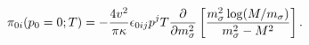 \begin{equation}\label{planarT}
{\cal{\pi}}_{0i} (p_0=0;T)=-\frac{4 v^2}{\pi \kappa} \epsilon_{0ij}p^j
T \frac{\partial}{\partial m_{\sigma}^2} \left[\frac{m_{\sigma}^2 \log
(M/{m_{\sigma}})}{m_{\sigma}^2 - M^2} \right].
\end{equation}

